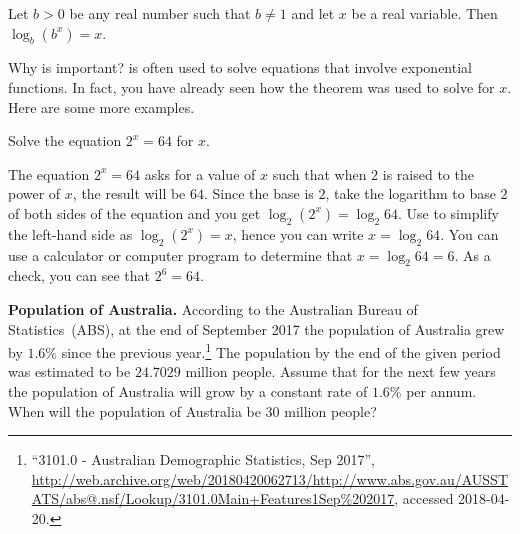 \documentclass[a4paper,oneside,12pt]{article}
\begin{document}
\begin{theorem}
\label{thm:logarithm:lob_b_b_power_x}
Let $b > 0$ be any real number such that $b \neq 1$ and let $x$ be a
real variable.  Then $\log_b (b^x) = x$.
\end{theorem}

Why is  important?
 is often used to solve
equations that involve exponential functions.  In fact, you have
already seen how the theorem was used to solve
 for $x$.  Here are some
more examples.

\begin{example}
Solve the equation $2^x = 64$ for $x$.
\end{example}

\begin{solution}
The equation $2^x = 64$ asks for a value of $x$ such that when $2$ is
raised to the power of $x$, the result will be $64$.  Since the base
is $2$, take the logarithm to base $2$ of both sides of the equation
and you get $\log_2(2^x) = \log_2 64$.  Use
 to simplify the left-hand side
as $\log_2(2^x) = x$, hence you can write $x = \log_2 64$.  You can
use a calculator or computer program to determine that
$x = \log_2 64 = 6$.  As a check, you can see that $2^6 = 64$.
\end{solution}

\begin{example}
\textbf{Population of Australia.}
According to the Australian Bureau of Statistics~(ABS), at the end of
September 2017 the population of Australia grew by $1.6\%$ since the
previous year.\footnote{
  ``3101.0 - Australian Demographic Statistics, Sep 2017'',
  \url{http://web.archive.org/web/20180420062713/http://www.abs.gov.au/AUSSTATS/abs@.nsf/Lookup/3101.0Main+Features1Sep\%202017},
  accessed 2018-04-20.
}
The population by the end of the given period was estimated to be
$24.7029$ million people.  Assume that for the next few years the
population of Australia will grow by a constant rate of $1.6\%$ per
annum.  When will the population of Australia be $30$ million people?
\end{example}
\end{document}
